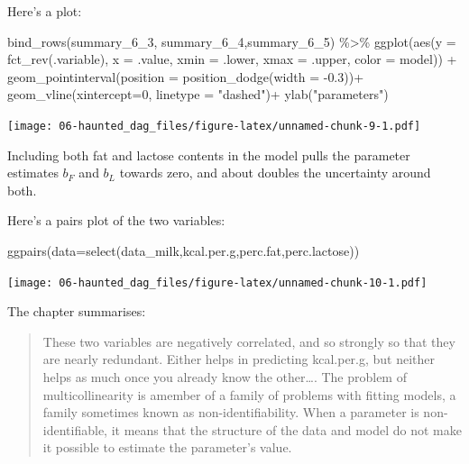 \documentclass[
]{book}
\newenvironment{Shaded}{\begin{snugshade}}{\end{snugshade}}
\newcommand{\AttributeTok}[1]{\textcolor[rgb]{0.77,0.63,0.00}{#1}}
\newcommand{\DecValTok}[1]{\textcolor[rgb]{0.00,0.00,0.81}{#1}}
\newcommand{\FloatTok}[1]{\textcolor[rgb]{0.00,0.00,0.81}{#1}}
\newcommand{\FunctionTok}[1]{\textcolor[rgb]{0.00,0.00,0.00}{#1}}
\newcommand{\NormalTok}[1]{#1}
\newcommand{\SpecialCharTok}[1]{\textcolor[rgb]{0.00,0.00,0.00}{#1}}
\newcommand{\StringTok}[1]{\textcolor[rgb]{0.31,0.60,0.02}{#1}}
\begin{document}
Here's a plot:

\begin{Shaded}
\begin{Highlighting}[]
\FunctionTok{bind\_rows}\NormalTok{(summary\_6\_3, summary\_6\_4,summary\_6\_5) }\SpecialCharTok{\%\textgreater{}\%}
  \FunctionTok{ggplot}\NormalTok{(}\FunctionTok{aes}\NormalTok{(}\AttributeTok{y =} \FunctionTok{fct\_rev}\NormalTok{(.variable), }\AttributeTok{x =}\NormalTok{ .value, }\AttributeTok{xmin =}\NormalTok{ .lower, }\AttributeTok{xmax =}\NormalTok{ .upper, }\AttributeTok{color =}\NormalTok{ model)) }\SpecialCharTok{+}
  \FunctionTok{geom\_pointinterval}\NormalTok{(}\AttributeTok{position =} \FunctionTok{position\_dodge}\NormalTok{(}\AttributeTok{width =} \SpecialCharTok{{-}}\FloatTok{0.3}\NormalTok{))}\SpecialCharTok{+}
  \FunctionTok{geom\_vline}\NormalTok{(}\AttributeTok{xintercept=}\DecValTok{0}\NormalTok{, }\AttributeTok{linetype =} \StringTok{"dashed"}\NormalTok{)}\SpecialCharTok{+}
  \FunctionTok{ylab}\NormalTok{(}\StringTok{"parameters"}\NormalTok{)}
\end{Highlighting}
\end{Shaded}

\texttt{[image: 06-haunted\_dag\_files/figure-latex/unnamed-chunk-9-1.pdf]}

Including both fat and lactose contents in the model pulls the parameter estimates \(b_F\) and \(b_L\) towards zero, and about doubles the uncertainty around both.

Here's a pairs plot of the two variables:

\begin{Shaded}
\begin{Highlighting}[]
\FunctionTok{ggpairs}\NormalTok{(}\AttributeTok{data=}\FunctionTok{select}\NormalTok{(data\_milk,kcal.per.g,perc.fat,perc.lactose))}
\end{Highlighting}
\end{Shaded}

\texttt{[image: 06-haunted\_dag\_files/figure-latex/unnamed-chunk-10-1.pdf]}

The chapter summarises:

\begin{quote}
These two variables are negatively correlated, and so strongly so that they are nearly redundant. Either helps in predicting kcal.per.g, but neither helps as much once you already know the other\ldots. The problem of multicollinearity is amember of a family of problems with fitting models, a family sometimes known as non-identifiability. When a parameter is non-identifiable, it means that the structure of the data and model do not make it possible to estimate the parameter's value.
\end{quote}
\end{document}
